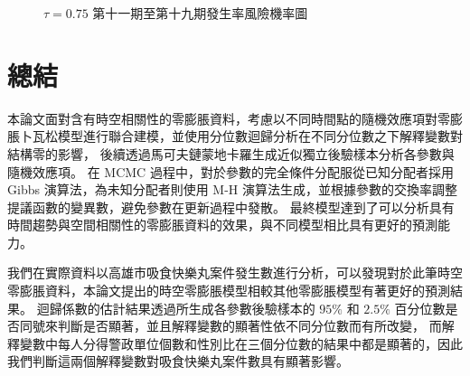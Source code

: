 \documentclass[12pt,a4paper]{article}
\begin{document}
\begin{CJK}{UTF8}{bkai}
\begin{figure}[htpb]
\caption{$\tau = 0.75$ 第十一期至第十九期發生率風險機率圖}
\label{Fig.main12}
\end{figure}

\newpage
\section{總結}\label{sec:5}
本論文面對含有時空相關性的零膨脹資料，考慮以不同時間點的隨機效應項對零膨脹卜瓦松模型進行聯合建模，並使用分位數迴歸分析在不同分位數之下解釋變數對結構零的影響，
後續透過馬可夫鏈蒙地卡羅生成近似獨立後驗樣本分析各參數與隨機效應項。
在 MCMC 過程中，對於參數的完全條件分配服從已知分配者採用 Gibbs 演算法，為未知分配者則使用 M-H 演算法生成，並根據參數的交換率調整提議函數的變異數，避免參數在更新過程中發散。
最終模型達到了可以分析具有時間趨勢與空間相關性的零膨脹資料的效果，與不同模型相比具有更好的預測能力。

我們在實際資料以高雄市吸食快樂丸案件發生數進行分析，可以發現對於此筆時空零膨脹資料，本論文提出的時空零膨脹模型相較其他零膨脹模型有著更好的預測結果。
迴歸係數的估計結果透過所生成各參數後驗樣本的 $95\%$ 和 $2.5\%$ 百分位數是否同號來判斷是否顯著，並且解釋變數的顯著性依不同分位數而有所改變，
而解釋變數中每人分得警政單位個數和性別比在三個分位數的結果中都是顯著的，因此我們判斷這兩個解釋變數對吸食快樂丸案件數具有顯著影響。


\end{CJK}
\end{document}
